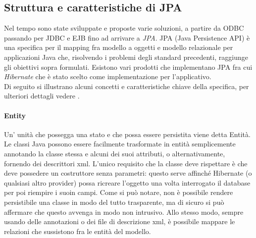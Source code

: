 \subsection{Struttura e caratteristiche di JPA}
Nel tempo sono state sviluppate e proposte varie soluzioni, a partire da ODBC passando per JDBC e EJB fino ad arrivare a \textsl{JPA}.
JPA (Java Persistence API) è una specifica per il mapping fra modello a oggetti e modello relazionale per applicazioni Java che, risolvendo i problemi degli standard precedenti, raggiunge
gli obiettivi sopra formulati. Esistono vari prodotti che implementano JPA fra cui \textsl{Hibernate} che è stato scelto come
implementazione per l'applicativo.\\
Di seguito si illustrano alcuni concetti e caratteristiche chiave della specifica, per ulteriori dettagli vedere \cite{jpa}.

\paragraph{Entity}
Un' unità che possegga una stato e che possa essere persistita viene detta Entità. Le classi Java possono essere facilmente trasformate in entità semplicemente annotando la classe stessa e alcuni dei suoi attributi, o alternativamente,
fornendo dei descrittori xml. L'unico
requisito che la classe deve rispettare è che deve possedere un costruttore senza parametri: questo serve affinché Hibernate (o qualsiasi altro provider) possa ricreare l'oggetto una volta interrogato il database per poi riempire i suoin campi.
Come si può notare, 
non è possibile rendere persistibile una classe in modo del tutto trasparente, ma di sicuro si può affermare che questo avvenga in modo non intrusivo. Allo stesso modo, sempre usando delle annotazioni o dei file di descrizione xml, 
è possibile mappare le relazioni che sussistono fra le entità del modello.


